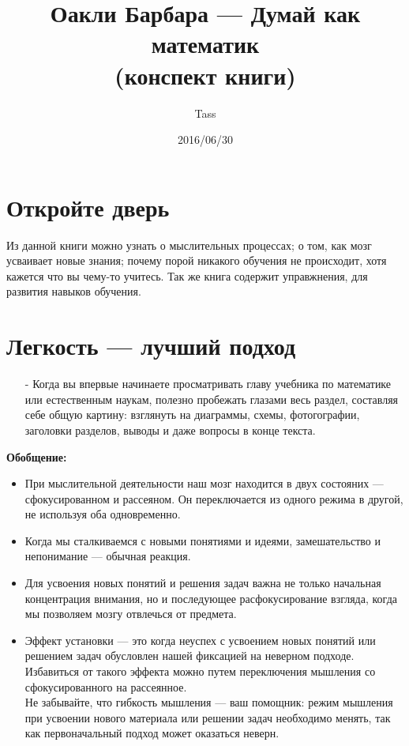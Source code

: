 \documentclass{article}
\begin{document}
\title{Оакли Барбара --- Думай как математик\\(конспект книги)}
\author{Tass}
\date{2016/06/30}
\maketitle

\tableofcontents
\newpage

\section{Откройте дверь}
Из данной книги можно узнать о мыслительных процессах; о том, как мозг усваивает новые знания; почему порой никакого обучения не происходит, хотя кажется что вы чему-то учитесь. Так же книга содержит управжнения, для развития навыков обучения.

\section{Легкость --- лучший подход}
\begin{itemize}
\item[-] Когда вы впервые начинаете просматривать главу учебника по математике или естественным наукам, полезно пробежать глазами весь раздел, составляя себе общую картину: взглянуть на диаграммы, схемы, фотогографии, заголовки разделов, выводы и даже вопросы в конце текста.
\end{itemize}
\textbf{Обобщение:}
\begin{itemize}
\item При мыслительной деятельности наш мозг находится в двух состояних --- сфокусированном и рассеяном. Он переключается из одного режима в другой, не используя оба одновременно.
\item Когда мы сталкиваемся с новыми понятиями и идеями, замешательство и непонимание --- обычная реакция.
\item Для усвоения новых понятий и решения задач важна не только начальная концентрация внимания, но и последующее расфокусирование взгляда, когда мы позволяем мозгу отвлечься от предмета.
\item Эффект установки --- это когда неуспех с усвоением новых понятий или решением задач обусловлен нашей фиксацией на неверном подходе. Избавиться от такого эффекта можно путем переключения мышления со сфокусированного на рассеянное.\\Не забывайте, что гибкость мышления --- ваш помощник: режим мышления при усвоении нового материала или решении задач необходимо менять, так как первоначальный подход может оказаться неверн.
\end{itemize}
\end{document}
